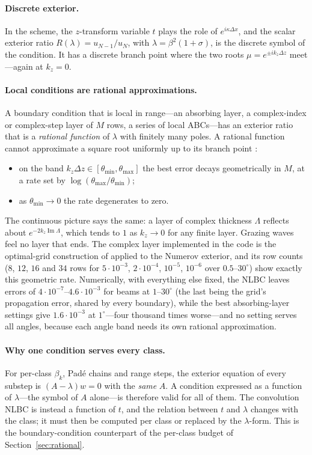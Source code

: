 \documentclass[11pt]{article}
\begin{document}
\paragraph{Discrete exterior.} In the scheme, the $z$-transform variable $t$
plays the role of $e^{i\kappa\Delta x}$, and the scalar exterior ratio
$R(\lambda)=u_{N-1}/u_N$, with $\lambda=\beta^2(1+\sigma)$, is the discrete
symbol of the condition. It has a discrete branch point where the two roots
$\mu=e^{\pm ik_z\Delta z}$ meet---again at $k_z=0$.

\paragraph{Local conditions are rational approximations.} A boundary condition
that is local in range---an absorbing layer, a complex-index or complex-step
layer of $M$ rows, a series of local ABCs---has an exterior ratio that is a
\emph{rational function} of $\lambda$ with finitely many poles. A rational
function cannot approximate a square root uniformly up to its branch point
\cite{newman,idk}:
\begin{itemize}
\item on the band $k_z\Delta z\in[\theta_{\min},\theta_{\max}]$ the best
  error decays geometrically in $M$, at a rate set by
  $\log(\theta_{\max}/\theta_{\min})$;
\item as $\theta_{\min}\to0$ the rate degenerates to zero.
\end{itemize}
The continuous picture says the same: a layer of complex thickness $\Lambda$
reflects about $e^{-2k_z\operatorname{Im}\Lambda}$, which tends to $1$ as
$k_z\to0$ for any finite layer. Grazing waves feel no layer that ends. The
complex layer implemented in the code is the optimal-grid construction of
\cite{idk,adgk} applied to the Numerov exterior, and its row counts
($8$, $12$, $16$ and $34$ rows for $5\cdot10^{-3}$, $2\cdot10^{-4}$,
$10^{-5}$, $10^{-6}$ over $0.5$--$30^\circ$) show exactly this geometric rate.
Numerically, with everything else fixed, the NLBC leaves errors of
$4\cdot10^{-7}$--$4.6\cdot10^{-3}$ for beams at $1$--$30^\circ$ (the last
being the grid's propagation error, shared by every boundary), while the best
absorbing-layer settings give $1.6\cdot10^{-3}$ at $1^\circ$---four thousand
times worse---and no setting serves all angles, because each angle band needs
its own rational approximation.

\paragraph{Why one condition serves every class.} For per-class $\beta_k$,
Pad\'e chains and range steps, the exterior equation of every substep is
$(A-\lambda)w=0$ with the \emph{same} $A$. A condition expressed as a function
of $\lambda$---the symbol of $A$ alone---is therefore valid for all of them.
The convolution NLBC is instead a function of $t$, and the relation between
$t$ and $\lambda$ changes with the class; it must then be computed per class
or replaced by the $\lambda$-form. This is the boundary-condition counterpart
of the per-class budget of Section~\ref{sec:rational}.
\end{document}
